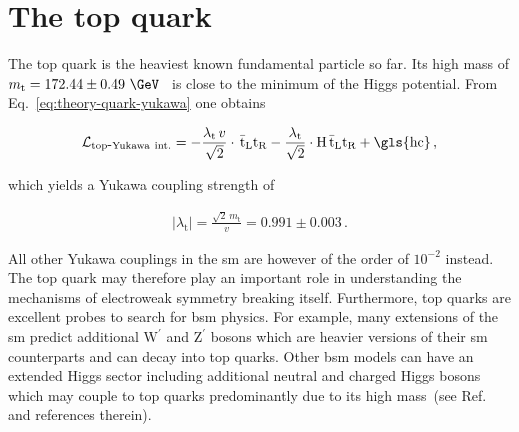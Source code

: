 \chapter{The top quark}
\label{ch:top}


The top quark is the heaviest known fundamental particle so far. Its high mass of $m_\mathrm{t}=172.44\pm0.49~\GeV$~\cite{Khachatryan:2015hba} is close to the minimum of the Higgs potential. From Eq.~\ref{eq:theory-quark-yukawa} one obtains

\begin{align}
\mathcal{L}_\mathrm{top\mbox{-}Yukawa~int.}=-\frac{\lambda_\mathrm{t}\,v}{\sqrt{2}}\cdot\,\bar{\mathrm{t}}_\mathrm{L}\mathrm{t}_\mathrm{R}-\frac{\lambda_\mathrm{t}}{\sqrt{2}}\cdot\mathrm{H}\,\bar{\mathrm{t}}_\mathrm{L}\mathrm{t}_\mathrm{R}+\mathrm{\gls{hc}}\,,
\end{align}

which yields a Yukawa coupling strength of 

\begin{align}
|\lambda_\mathrm{t}|=\frac{\sqrt{2}\,m_\mathrm{t}}{v}=0.991\pm0.003\,. 
\end{align}

All other Yukawa couplings in the \gls{sm} are however of the order of $10^{-2}$ instead. The top quark may therefore play an important role in understanding the mechanisms of electroweak symmetry breaking itself. Furthermore, top quarks are excellent probes to search for \gls{bsm} physics. For example, many extensions of the \gls{sm} predict additional $\mathrm{W}^{\prime}$ and $\mathrm{Z}^{\prime}$ bosons which are heavier versions of their \gls{sm} counterparts and can decay into top quarks. Other \gls{bsm} models can have an extended Higgs sector including additional neutral and charged Higgs bosons which may couple to top quarks predominantly due to its high mass~(see Ref.~\cite{Boos:2006xe} and references therein).

